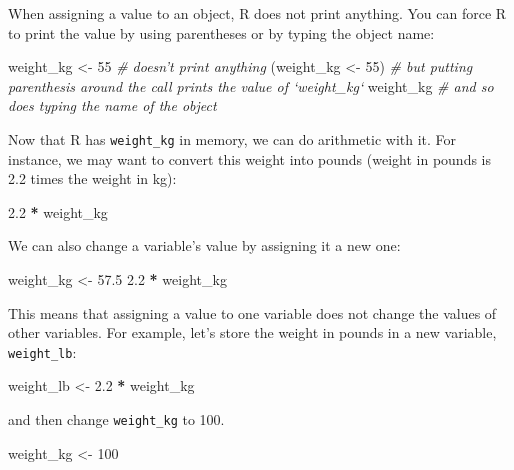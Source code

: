 \documentclass[]{book}
\newenvironment{Shaded}{\begin{snugshade}}{\end{snugshade}}
\newcommand{\DecValTok}[1]{\textcolor[rgb]{0.00,0.00,0.81}{#1}}
\newcommand{\FloatTok}[1]{\textcolor[rgb]{0.00,0.00,0.81}{#1}}
\newcommand{\StringTok}[1]{\textcolor[rgb]{0.31,0.60,0.02}{#1}}
\newcommand{\CommentTok}[1]{\textcolor[rgb]{0.56,0.35,0.01}{\textit{#1}}}
\newcommand{\OperatorTok}[1]{\textcolor[rgb]{0.81,0.36,0.00}{\textbf{#1}}}
\newcommand{\NormalTok}[1]{#1}
\theoremstyle{definition}
\theoremstyle{definition}
\theoremstyle{definition}
\theoremstyle{remark}
\begin{document}
When assigning a value to an object, R does not print anything. You can
force R to print the value by using parentheses or by typing the object
name:

\begin{Shaded}
\begin{Highlighting}[]
\NormalTok{weight_kg <-}\StringTok{ }\DecValTok{55}    \CommentTok{# doesn't print anything}
\NormalTok{(weight_kg <-}\StringTok{ }\DecValTok{55}\NormalTok{)  }\CommentTok{# but putting parenthesis around the call prints the value of `weight_kg`}
\NormalTok{weight_kg          }\CommentTok{# and so does typing the name of the object}
\end{Highlighting}
\end{Shaded}

Now that R has \texttt{weight\_kg} in memory, we can do arithmetic with
it. For instance, we may want to convert this weight into pounds (weight
in pounds is 2.2 times the weight in kg):

\begin{Shaded}
\begin{Highlighting}[]
\FloatTok{2.2} \OperatorTok{*}\StringTok{ }\NormalTok{weight_kg}
\end{Highlighting}
\end{Shaded}

We can also change a variable's value by assigning it a new one:

\begin{Shaded}
\begin{Highlighting}[]
\NormalTok{weight_kg <-}\StringTok{ }\FloatTok{57.5}
\FloatTok{2.2} \OperatorTok{*}\StringTok{ }\NormalTok{weight_kg}
\end{Highlighting}
\end{Shaded}

This means that assigning a value to one variable does not change the
values of other variables. For example, let's store the weight in pounds
in a new variable, \texttt{weight\_lb}:

\begin{Shaded}
\begin{Highlighting}[]
\NormalTok{weight_lb <-}\StringTok{ }\FloatTok{2.2} \OperatorTok{*}\StringTok{ }\NormalTok{weight_kg}
\end{Highlighting}
\end{Shaded}

and then change \texttt{weight\_kg} to 100.

\begin{Shaded}
\begin{Highlighting}[]
\NormalTok{weight_kg <-}\StringTok{ }\DecValTok{100}
\end{Highlighting}
\end{Shaded}
\end{document}
